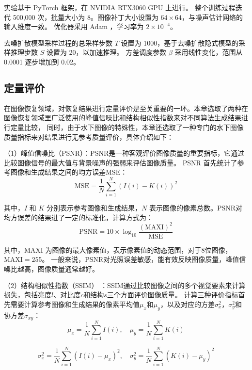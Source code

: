 实验基于 PyTorch 框架，在 NVIDIA RTX3060 GPU 上进行。
整个训练过程迭代 500,000 次，批量大小为 8。图像补丁大小设置为 $64 \times 64$，与噪声估计网络的输入维度一致。
优化器采用 Adam \cite{kingma2017adam}，学习率为 $2 \times 10^{-4}$。

去噪扩散模型采样过程的总采样步数 $T$ 设置为 1000，基于去噪扩散隐式模型的采样推理步数 $S$ 设置为 20，以加速推理。
方差调度参数 $\beta$ 采用线性变化，范围从 0.0001 逐步增加到 0.02。

\subsection{定量评价} \label{sec:quantitative}
在图像恢复领域，对恢复结果进行定量评价是至关重要的一环。本章选取了两种在图像恢复领域里广泛使用的峰值信噪比和结构相似性指数来对不同算法生成结果进行定量比较，
同时，由于水下图像的特殊性，本章还选取了一种专门的水下图像质量指标来对结果进行无参考质量评价，具体介绍如下：

（1）峰值信噪比（PSNR）：PSNR是一种客观评价图像质量的重要指标，它通过比较图像信号的最大值与背景噪声的强弱来评估图像质量。
PSNR 首先统计了参考图像和生成结果之间的均方误差$\mathrm{MSE}$：
\begin{equation}
    \mathrm{MSE} = \frac{1}{N} \sum_{i=1}^{N} (I(i) - K(i))^2
\end{equation}

其中，$I$ 和 $K$ 分别表示参考图像和生成结果，$N$ 表示图像的像素总数。PSNR对均方误差的结果进了一定的标准化，计算方式为：
\begin{equation}
    \mathrm{PSNR} =10 \times \log _{10} \frac{(\mathrm{MAXI})^2}{\mathrm{MSE}}
\end{equation}

其中，$\mathrm{MAXI}$ 为图像的最大像素值，表示像素值的动态范围，对于8位图像，$\mathrm{MAXI}=255$。
一般来说，PSNR对光照误差敏感，能有效反映图像质量，峰值信噪比越高，图像质量通常越好。

（2）结构相似性指数（SSIM） \cite{ssim}：SSIM通过比较图像之间的多个视觉要素来计算损失，包括亮度$l$、对比度$c$和结构$s$三个方面评价图像质量。
计算三种评价指标首先需要计算参考图像和生成结果的像素平均值$\mu_x$和$\mu_y$，以及对应的方差$\sigma_x^2$，$\sigma_y^2$和协方差$\sigma_{xy}$：
\begin{equation}
    \mu_x = \frac{1}{N} \sum_{i=1}^{N} I(i) , \quad \mu_y = \frac{1}{N} \sum_{i=1}^{N} K(i)
\end{equation}

\begin{equation}
    \sigma_x^2 = \frac{1}{N} \sum_{i=1}^{N} (I(i) - \mu_x)^2 , \quad \sigma_y^2 = \frac{1}{N} \sum_{i=1}^{N} (K(i) - \mu_y)^2
\end{equation}

